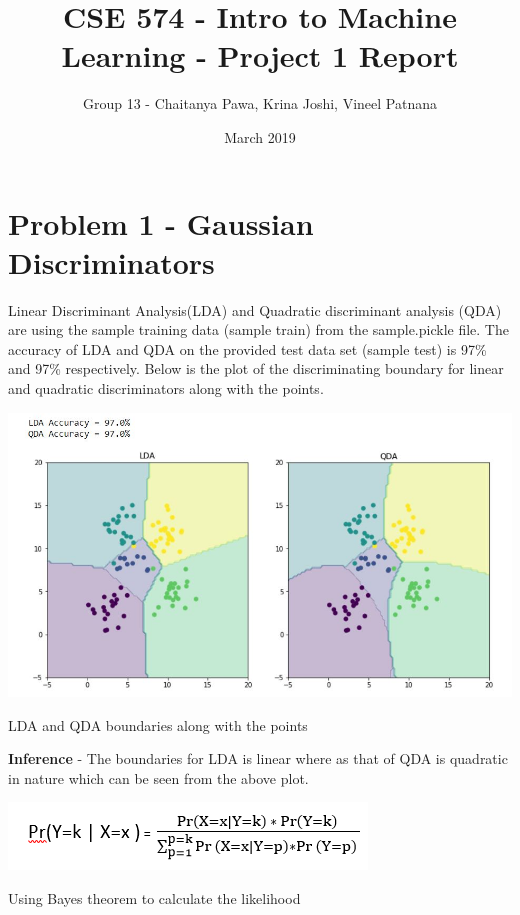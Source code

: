 \documentclass[12pt]{extarticle}
\title{CSE 574 - Intro to Machine Learning - Project 1 Report}
\author{Group 13 - Chaitanya Pawa, Krina Joshi, Vineel Patnana}
\date{March 2019}
\begin{document}
\maketitle

\section{Problem 1 - Gaussian Discriminators}

Linear Discriminant Analysis(LDA) and Quadratic discriminant analysis (QDA) are using the sample training data (sample train) from the sample.pickle file. The accuracy of LDA and QDA on the provided test data set (sample test) is 97\% and 97\% respectively. Below is the  plot of the discriminating boundary for linear and quadratic discriminators along with the points.

\begin{center}
  \centering
  \includegraphics[width=\textwidth]{Q1.JPG}
  \caption{LDA and QDA boundaries along with the points}
\end{center}

\textbf{Inference} - The boundaries for LDA is linear where as that of QDA is quadratic in nature which can be seen from the above plot. 


\begin{center}
  \centering
  \includegraphics[width=\textwidth]{Bayes_v3.png}
  \caption{Using Bayes theorem to calculate the likelihood}
\end{center}
\end{document}
